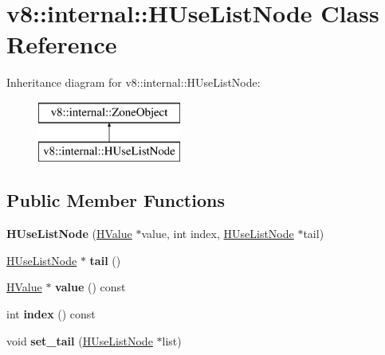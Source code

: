 \hypertarget{classv8_1_1internal_1_1_h_use_list_node}{}\section{v8\+:\+:internal\+:\+:H\+Use\+List\+Node Class Reference}
\label{classv8_1_1internal_1_1_h_use_list_node}
Inheritance diagram for v8\+:\+:internal\+:\+:H\+Use\+List\+Node\+:\begin{figure}[H]
\begin{center}
\leavevmode
\includegraphics[height=2.000000cm]{classv8_1_1internal_1_1_h_use_list_node}
\end{center}
\end{figure}
\subsection*{Public Member Functions}
\begin{DoxyCompactItemize}
\item 
{\bfseries H\+Use\+List\+Node} (\hyperlink{classv8_1_1internal_1_1_h_value}{H\+Value} $\ast$value, int index, \hyperlink{classv8_1_1internal_1_1_h_use_list_node}{H\+Use\+List\+Node} $\ast$tail)\hypertarget{classv8_1_1internal_1_1_h_use_list_node_a402e6b4e5106b4081069dee981c4813d}{}\label{classv8_1_1internal_1_1_h_use_list_node_a402e6b4e5106b4081069dee981c4813d}

\item 
\hyperlink{classv8_1_1internal_1_1_h_use_list_node}{H\+Use\+List\+Node} $\ast$ {\bfseries tail} ()\hypertarget{classv8_1_1internal_1_1_h_use_list_node_a17ad25f823c9b4391cf3c6176b96604a}{}\label{classv8_1_1internal_1_1_h_use_list_node_a17ad25f823c9b4391cf3c6176b96604a}

\item 
\hyperlink{classv8_1_1internal_1_1_h_value}{H\+Value} $\ast$ {\bfseries value} () const \hypertarget{classv8_1_1internal_1_1_h_use_list_node_af95878151f6e452f6af433e3827b1e76}{}\label{classv8_1_1internal_1_1_h_use_list_node_af95878151f6e452f6af433e3827b1e76}

\item 
int {\bfseries index} () const \hypertarget{classv8_1_1internal_1_1_h_use_list_node_aae5ae3407778866c9ce35d7cb2eaf386}{}\label{classv8_1_1internal_1_1_h_use_list_node_aae5ae3407778866c9ce35d7cb2eaf386}

\item 
void {\bfseries set\+\_\+tail} (\hyperlink{classv8_1_1internal_1_1_h_use_list_node}{H\+Use\+List\+Node} $\ast$list)\hypertarget{classv8_1_1internal_1_1_h_use_list_node_ae889078e1f0421c1df1e9b581aa02277}{}\label{classv8_1_1internal_1_1_h_use_list_node_ae889078e1f0421c1df1e9b581aa02277}

\end{DoxyCompactItemize}
